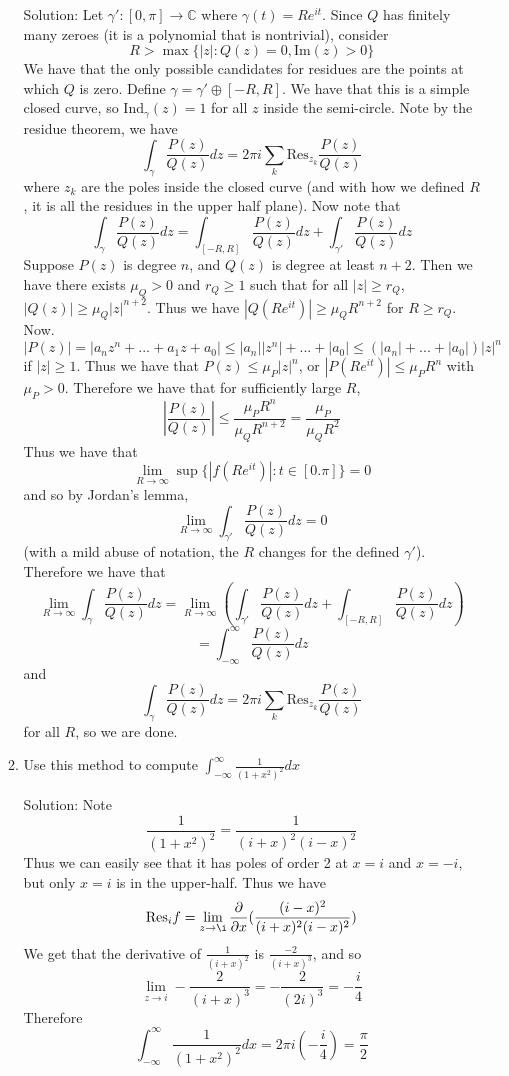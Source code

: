 \documentclass[11pt]{article}
\newcommand{\im}[0]{\text{Im}}
\newcommand{\C}{\mathbb{C}}
\newcommand{\Ind}{\text{Ind}}
\newcommand{\Res}{\text{Res}}
\begin{document}
\begin{enumerate}[(1)]
\begin{enumerate}
Solution: Let $\gamma':[0, \pi] \to \C$ where $\gamma(t) = Re^{it}$. Since $Q$ has finitely many zeroes (it is a polynomial that is nontrivial), consider 
$$ R > \max \{ |z| : Q(z) = 0, \im(z) > 0\} $$
We have that the only possible candidates for residues are the points at which $Q$ is zero. Define $\gamma = \gamma' \oplus [-R, R]$. We have that this is a simple closed curve, so $\Ind_\gamma(z) = 1$ for all $z$ inside the semi-circle. Note by the residue theorem, we have 
$$ \int_\gamma \frac{P(z)}{Q(z)} dz = 2\pi i\sum_k \Res_{z_k} \frac{P(z)}{Q(z)} $$
where $z_k$ are the poles inside the closed curve (and with how we defined $R$, it is all the residues in the upper half plane).
Now note that 
$$ \int_\gamma \frac{P(z)}{Q(z)} dz = \int_{[-R, R]} \frac{P(z)}{Q(z)}dz + \int_{\gamma'} \frac{P(z)}{Q(z)} dz $$
Suppose $P(z)$ is degree $n$, and $Q(z)$ is degree at least $n+2$. Then we have there exists $\mu_Q > 0$ and $r_Q \geq 1$ such that for all $|z| \geq r_Q$, $|Q(z)| \geq \mu_Q |z|^{n+2}$. Thus we have $|Q(Re^{it})| \geq \mu_Q R^{n+2}$ for $R \geq r_Q$. Now.
$$ |P(z)| = |a_nz^n + ... + a_1z + a_0| \leq |a_n||z^n| + ... + |a_0| \leq (|a_n| + ... + |a_0|)|z|^n $$
if $|z| \geq 1$. Thus we have that $P(z) \leq \mu_P |z|^n$, or $|P(Re^{it})| \leq \mu_P R^n$ with $\mu_P > 0$. Therefore we have that for sufficiently large $R$,
$$ \left| \frac{P(z)}{Q(z)}\right| \leq \frac{\mu_P R^n}{\mu_Q R^{n+2}} = \frac{\mu_P}{\mu_QR^2} $$
Thus we have that 
$$ \lim_{R \to \infty} \sup \{ |f(Re^{it})|: t \in [0. \pi]\} = 0 $$
and so by Jordan's lemma,
$$ \lim_{R \to \infty} \int_{\gamma'}\frac{P(z)}{Q(z)} dz = 0 $$
(with a mild abuse of notation, the $R$ changes for the defined $\gamma'$). Therefore we have that 
$$ \lim_{R \to \infty} \int_\gamma \frac{P(z)}{Q(z)}dz = \lim_{R\to\infty}\left( \int_{\gamma'} \frac{P(z)}{Q(z)}dz + \int_{[-R, R]} \frac{P(z)}{Q(z)}dz \right)$$
$$ = \int_{-\infty}^\infty \frac{P(z)}{Q(z)}dz $$
and 
$$ \int_\gamma \frac{P(z)}{Q(z)}dz = 2\pi i\sum_k \Res_{z_k} \frac{P(z)}{Q(z)} $$
for all $R$, so we are done.

\item Use this method to compute $\int_{-\infty}^\infty \frac{1}{(1+x^2)^2} dx$

Solution: Note 
$$ \frac{1}{(1+x^2)^2} = \frac{1}{(i + x)^2(i - x)^2} $$
Thus we can easily see that it has poles of order 2 at $x = i$ and $x = -i$, but only $x = i$ is in the upper-half. Thus we have 
$$ \Res_i f = \lim_{z \to \i} \frac{\partial}{\partial x} (\frac{(i - x)^2}{(i + x)^2(i - x)^2}) $$
We get that the derivative of $\frac{1}{(i+x)^2}$ is $\frac{-2}{(i+x)^3}$, and so 
$$ \lim_{z \to i} -\frac{2}{(i+x)^3} = -\frac{2}{(2i)^3} = -\frac{i}{4} $$
Therefore 
$$ \int_{-\infty}^\infty \frac{1}{(1+x^2)^2} dx = 2\pi i(-\frac{i}{4}) = \frac{\pi}{2} $$


\end{enumerate}
\end{enumerate}
\end{document}
